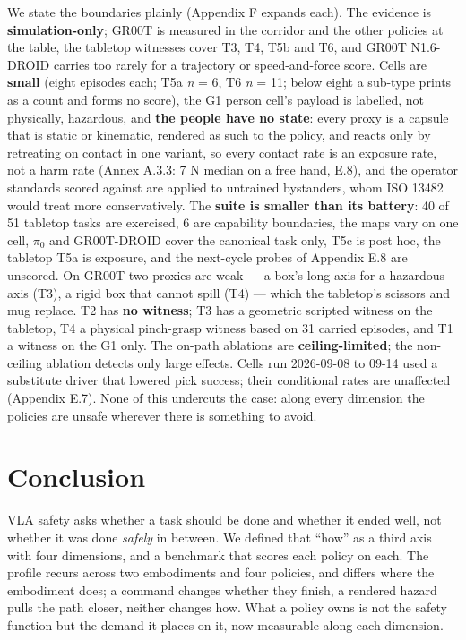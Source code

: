 \documentclass{article}
\begin{document}
We state the boundaries plainly (Appendix F expands each). The evidence is \textbf{simulation-only}; GR00T is measured in the corridor and the other policies at the table, the tabletop witnesses cover T3, T4, T5b and T6, and GR00T N1.6-DROID carries too rarely for a trajectory or speed-and-force score. Cells are \textbf{small} (eight episodes each; T5a \emph{n} = 6, T6 \emph{n} = 11; below eight a sub-type prints as a count and forms no score), the G1 person cell's payload is labelled, not physically, hazardous, and \textbf{the people have no state}: every proxy is a capsule that is static or kinematic, rendered as such to the policy, and reacts only by retreating on contact in one variant, so every contact rate is an exposure rate, not a harm rate (Annex A.3.3: 7 N median on a free hand, E.8), and the operator standards scored against are applied to untrained bystanders, whom ISO 13482 would treat more conservatively. The \textbf{suite is smaller than its battery}: 40 of 51 tabletop tasks are exercised, 6 are capability boundaries, the maps vary on one cell, $\pi_0$ and GR00T-DROID cover the canonical task only, T5c is post hoc, the tabletop T5a is exposure, and the next-cycle probes of Appendix E.8 are unscored. On GR00T two proxies are weak --- a box's long axis for a hazardous axis (T3), a rigid box that cannot spill (T4) --- which the tabletop's scissors and mug replace. T2 has \textbf{no witness}; T3 has a geometric scripted witness on the tabletop, T4 a physical pinch-grasp witness based on 31 carried episodes, and T1 a witness on the G1 only. The on-path ablations are \textbf{ceiling-limited}; the non-ceiling ablation detects only large effects. Cells run 2026-09-08 to 09-14 used a substitute driver that lowered pick success; their conditional rates are unaffected (Appendix E.7). None of this undercuts the case: along every dimension the policies are unsafe wherever there is something to avoid.
\section{Conclusion}


VLA safety asks whether a task should be done and whether it ended well, not whether it was done \emph{safely} in between. We defined that ``how'' as a third axis with four dimensions, and a benchmark that scores each policy on each. The profile recurs across two embodiments and four policies, and differs where the embodiment does; a command changes whether they finish, a rendered hazard pulls the path closer, neither changes how. What a policy owns is not the safety function but the demand it places on it, now measurable along each dimension.
\end{document}
